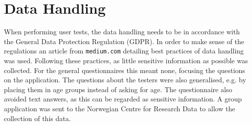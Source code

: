\section{Data Handling}
    When performing user tests, the data handling needs to be in accordance with the General Data Protection Regulation (GDPR)\cite{gdpr_eu}. In order to make sense of the regulations an article from \texttt{medium.com} detailing best practices of data handling was used. Following these practices, as little sensitive information as possible was collected. For the general questionnaires this meant none, focusing the questions on the application. The questions about the testers were also generalised, e.g. by placing them in age groups instead of asking for age. The questionnaire also avoided text answers, as this can be regarded as sensitive information.
    A group application was sent to the Norwegian Centre for Research Data to allow the collection of this data. 
    
    

        
